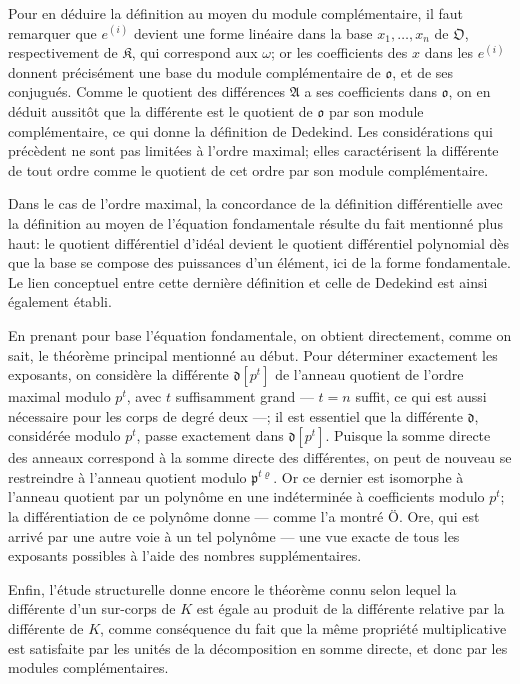 Pour en déduire la définition au moyen du module complémentaire, il faut remarquer que \(e^{(i)}\) devient une forme linéaire dans la base \(x_1,\ldots,x_n\) de \(\mathfrak O\), respectivement de \(\mathfrak K\), qui correspond aux \(\omega\); or les coefficients des \(x\) dans les \(e^{(i)}\) donnent précisément une base du module complémentaire de \(\mathfrak o\), et de ses conjugués. Comme le quotient des différences \(\mathfrak A\) a ses coefficients dans \(\mathfrak o\), on en déduit aussitôt que la différente est le quotient de \(\mathfrak o\) par son module complémentaire, ce qui donne la définition de Dedekind. Les considérations qui précèdent ne sont pas limitées à l'ordre maximal; elles caractérisent la différente de tout ordre comme le quotient de cet ordre par son module complémentaire.

Dans le cas de l'ordre maximal, la concordance de la définition différentielle avec la définition au moyen de l'équation fondamentale résulte du fait mentionné plus haut: le quotient différentiel d'idéal devient le quotient différentiel polynomial dès que la base se compose des puissances d'un élément, ici de la forme fondamentale. Le lien conceptuel entre cette dernière définition et celle de Dedekind est ainsi également établi.

En prenant pour base l'équation fondamentale, on obtient directement, comme on sait, le théorème principal mentionné au début. Pour déterminer exactement les exposants, on considère la différente \(\mathfrak d[p^t]\) de l'anneau quotient de l'ordre maximal modulo \(p^t\), avec \(t\) suffisamment grand --- \(t=n\) suffit, ce qui est aussi nécessaire pour les corps de degré deux ---; il est essentiel que la différente \(\mathfrak d\), considérée modulo \(p^t\), passe exactement dans \(\mathfrak d[p^t]\). Puisque la somme directe des anneaux correspond à la somme directe des différentes, on peut de nouveau se restreindre à l'anneau quotient modulo \(\mathfrak p^{t\varrho}\). Or ce dernier est isomorphe à l'anneau quotient par un polynôme en une indéterminée à coefficients modulo \(p^t\); la différentiation de ce polynôme donne --- comme l'a montré Ö. Ore, qui est arrivé par une autre voie à un tel polynôme --- une vue exacte de tous les exposants possibles à l'aide des nombres supplémentaires.

Enfin, l'étude structurelle donne encore le théorème connu selon lequel la différente d'un sur-corps de \(K\) est égale au produit de la différente relative par la différente de \(K\), comme conséquence du fait que la même propriété multiplicative est satisfaite par les unités de la décomposition en somme directe, et donc par les modules complémentaires.

